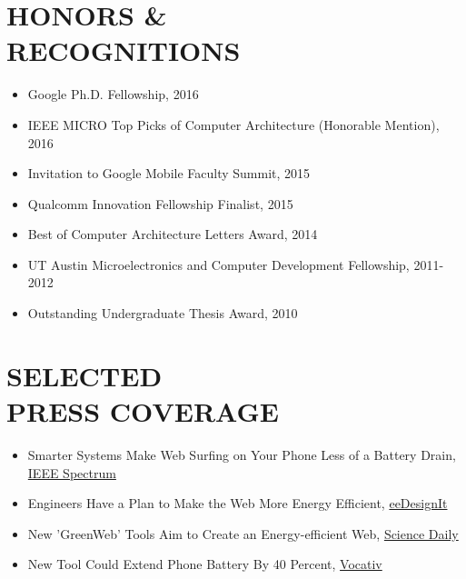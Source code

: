 \documentclass[margin, 9pt]{res} %
\begin{document}
\begin{resume}
 
\section{HONORS \&\\ RECOGNITIONS}

\vspace*{-1pt}
\begin{itemize}[leftmargin=*] \itemsep -4pt
        \item Google Ph.D. Fellowship, 2016
	\item IEEE MICRO Top Picks of Computer Architecture (Honorable Mention), 2016
	\item Invitation to Google Mobile Faculty Summit, 2015
	\item Qualcomm Innovation Fellowship Finalist, 2015
	\item Best of Computer Architecture Letters Award, 2014
	\item UT Austin Microelectronics and Computer Development Fellowship, 2011-2012
	\item Outstanding Undergraduate Thesis Award, 2010
\end{itemize}

 
\section{SELECTED \\ PRESS COVERAGE}

\vspace*{-1pt}
\begin{itemize}[leftmargin=*] \itemsep -4pt
        \item Smarter Systems Make Web Surfing on Your Phone Less of a Battery Drain, \href{http://spectrum.ieee.org/energywise/consumer-electronics/portable-devices/smarter-systems-slow-the-battery-drain-of-web-surfing-on-your-phone}{IEEE Spectrum}
        \item Engineers Have a Plan to Make the Web More Energy Efficient, \href{http://www.eedesignit.com/researchers-have-a-plan-to-make-the-web-more-energy-efficient/}{eeDesignIt}
        \item New 'GreenWeb' Tools Aim to Create an Energy-efficient Web, \href{https://www.sciencedaily.com/releases/2016/06/160616110244.htm}{Science Daily}
        \item New Tool Could Extend Phone Battery By 40 Percent, \href{http://www.vocativ.com/330599/new-tool-could-extend-phone-battery-by-40-percent/}{Vocativ}
\end{itemize}


\end{resume}
\end{document}
